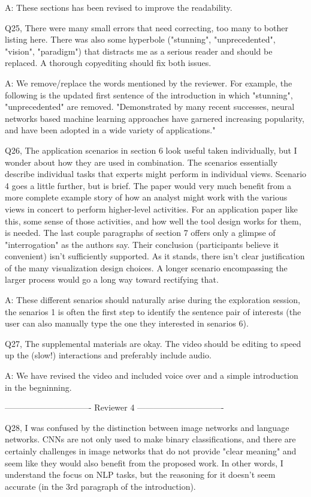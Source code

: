 A: These sections has been revised to improve the readability.

Q25, There were many small errors that need correcting, too many to bother listing here. There was also some hyperbole ("stunning", "unprecedented", "vision", "paradigm") that distracts me as a serious reader and should be replaced. A thorough copyediting should fix both issues.

A: We remove/replace the words mentioned by the reviewer. For example, the following is the updated first sentence of the introduction in which "stunning", "unprecedented" are removed. "Demonstrated by many recent successes, neural networks based machine learning approaches have garnered increasing popularity, and have been adopted in a wide variety of applications."


Q26, The application scenarios in section 6 look useful taken individually, but I wonder about how they are used in combination. The scenarios essentially describe individual tasks that experts might perform in individual views. Scenario 4 goes a little further, but is brief. The paper would very much benefit from a more complete example story of how an analyst might work with the various views in concert to perform higher-level activities. For an application paper like this, some sense of those activities, and how well the tool design works for them, is needed. The last couple paragraphs of section 7 offers only a glimpse of "interrogation" as the authors say.
Their conclusion (participants believe it convenient) isn't sufficiently supported. As it stands, there isn't clear justification of the many visualization design choices. A longer scenario encompassing the larger process would go a long way toward rectifying that.

A: These different senarios should naturally arise during the exploration session, the senarios 1 is often the first step to identify the sentence pair of interests (the user can also manually type the one they interested in senarios 6).

Q27, The supplemental materials are okay. The video should be editing to speed up the (slow!) interactions and preferably include audio.

A: We have revised the video and included voice over and a simple introduction in the begninning.


------------------------------- Reviewer 4 -------------------------------

Q28, I was confused by the distinction between image networks and language networks. CNNs are not only used to make binary classifications, and there are certainly challenges in image networks that do not provide "clear meaning" and seem like they would also benefit from the proposed work. In other words, I understand the focus on NLP tasks, but the reasoning for it doesn't seem accurate (in the 3rd paragraph of the introduction).

